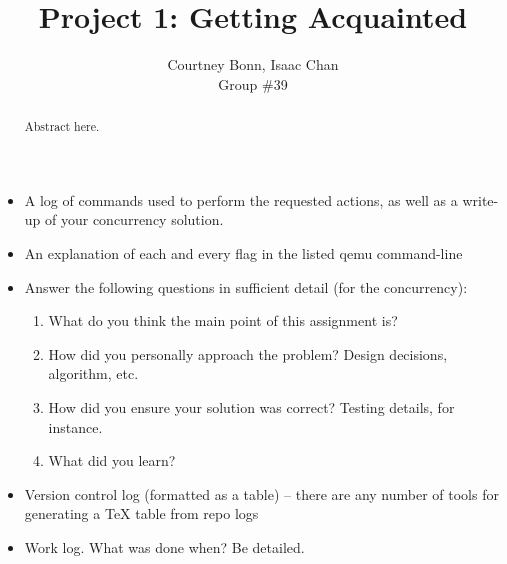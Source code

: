 \documentclass[letterpaper,10pt,draftclsnofoot,onecolumn,titlepage]{IEEEtran}
\def\name{Courtney Bonn, Isaac Chan}
\def\grp{Group \#39}
\begin{document}
\title{Project 1: Getting Acquainted}
\author{\name \\ \grp}

\maketitle

\begin{abstract}
Abstract here.
\end{abstract}

\clearpage


\begin{itemize}
	\item A log of commands used to perform the requested actions, as well as a write-up of your concurrency solution.
	\item An explanation of each and every flag in the listed qemu command-line
	\item Answer the following questions in sufficient detail (for the concurrency):
    \begin{enumerate}  
		\item What do you think the main point of this assignment is?
		\item How did you personally approach the problem? Design decisions, algorithm, etc.
		\item How did you ensure your solution was correct? Testing details, for instance.
		\item What did you learn?
 	\end{enumerate}
	\item Version control log (formatted as a table) -- there are any number of tools for generating a TeX table from repo logs
	\item Work log. What was done when? Be detailed.
\end{itemize}
\end{document}
